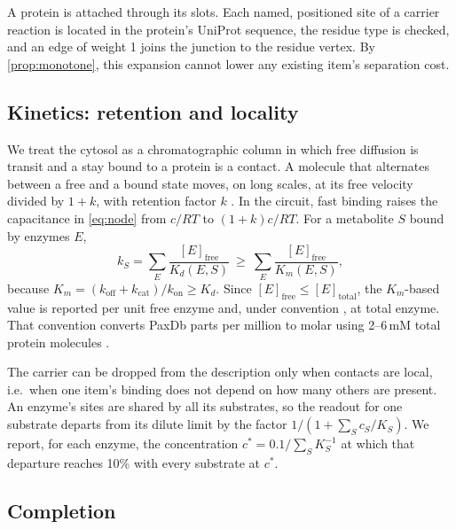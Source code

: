 A protein is attached through its slots.
Each named, positioned site of a carrier reaction is located in the protein's UniProt sequence, the residue type is checked, and an edge of weight 1 joins the junction to the residue vertex.
By \cref{prop:monotone}, this expansion cannot lower any existing item's separation cost.

\subsection{Kinetics: retention and locality}
\label{sec:kinetics}

We treat the cytosol as a chromatographic column in which free diffusion is transit and a stay bound to a protein is a contact.
A molecule that alternates between a free and a bound state moves, on long scales, at its free velocity divided by $1+k$, with retention factor $k$ \citep{giddings1991unified}.
In the circuit, fast binding raises the capacitance in \cref{eq:node} from $c/RT$ to $(1+k)c/RT$.
For a metabolite $S$ bound by enzymes $E$,
\begin{equation}
  k_S=\sum_E\frac{[E]_{\mathrm{free}}}{K_d(E,S)}\ \ge\ \sum_E\frac{[E]_{\mathrm{free}}}{K_m(E,S)},
\end{equation}
because $K_m=(k_{\mathrm{off}}+k_{\mathrm{cat}})/k_{\mathrm{on}}\ge K_d$.
Since $[E]_{\mathrm{free}}\le[E]_{\mathrm{total}}$, the $K_m$-based value is reported per unit free enzyme and, under convention , at total enzyme.
That convention converts PaxDb parts per million to molar using 2--6\,mM total protein molecules \citep{milo2013protein}.

The carrier can be dropped from the description only when contacts are local, i.e.\ when one item's binding does not depend on how many others are present.
An enzyme's sites are shared by all its substrates, so the readout for one substrate departs from its dilute limit by the factor $1/(1+\sum_S c_S/K_S)$.
We report, for each enzyme, the concentration $c^\ast=0.1/\sum_S K_S^{-1}$ at which that departure reaches 10\% with every substrate at $c^\ast$.

\subsection{Completion}
\label{sec:complete}

